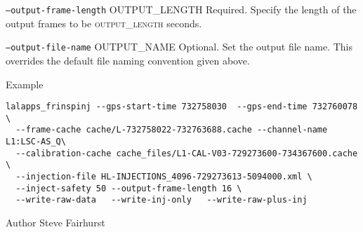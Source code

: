 \begin{entry}
\begin{entry}
\item[\texttt{--output-frame-length} \textsc{OUTPUT\_LENGTH}]  Required.
Specify the length of the output frames to be \textsc{output\_length}
seconds.

\item[\texttt{--output-file-name} \textsc{OUTPUT\_NAME} ] Optional.
Set the output file name.  This overrides the default file naming
convention given above.

\end{entry}


\item[Example]
\begin{verbatim}
lalapps_frinspinj --gps-start-time 732758030  --gps-end-time 732760078 \
  --frame-cache cache/L-732758022-732763688.cache --channel-name L1:LSC-AS_Q\	
  --calibration-cache cache_files/L1-CAL-V03-729273600-734367600.cache \
  --injection-file HL-INJECTIONS_4096-729273613-5094000.xml \
  --inject-safety 50 --output-frame-length 16 \
  --write-raw-data   --write-inj-only   --write-raw-plus-inj 
\end{verbatim}

\item[Author] 
Steve Fairhurst
\end{entry}

